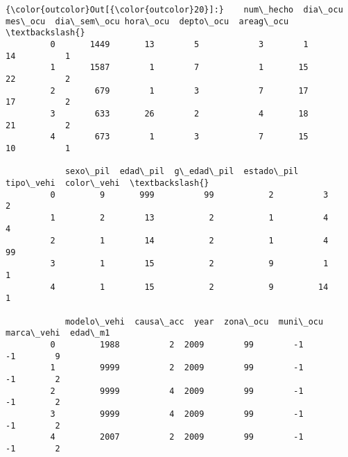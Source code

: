 \documentclass[11pt]{article}
\begin{document}
\begin{Verbatim}[commandchars=\\\{\}]
{\color{outcolor}Out[{\color{outcolor}20}]:}    num\_hecho  dia\_ocu  mes\_ocu  dia\_sem\_ocu hora\_ocu  depto\_ocu  areag\_ocu  \textbackslash{}
         0       1449       13        5            3        1         14          1   
         1       1587        1        7            1       15         22          2   
         2        679        1        3            7       17         17          2   
         3        633       26        2            4       18         21          2   
         4        673        1        3            7       15         10          1   
         
            sexo\_pil  edad\_pil  g\_edad\_pil  estado\_pil  tipo\_vehi  color\_vehi  \textbackslash{}
         0         9       999          99           2          3           2   
         1         2        13           2           1          4           4   
         2         1        14           2           1          4          99   
         3         1        15           2           9          1           1   
         4         1        15           2           9         14           1   
         
            modelo\_vehi  causa\_acc  year  zona\_ocu  muni\_ocu  marca\_vehi  edad\_m1  
         0         1988          2  2009        99        -1          -1        9  
         1         9999          2  2009        99        -1          -1        2  
         2         9999          4  2009        99        -1          -1        2  
         3         9999          4  2009        99        -1          -1        2  
         4         2007          2  2009        99        -1          -1        2  
\end{Verbatim}
            
\end{document}
